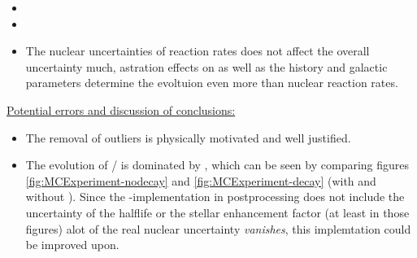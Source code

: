 \begin{itemize}
\item {}
  \item {}
  \item The nuclear uncertainties of reaction rates does not affect the overall uncertainty much, astration effects on  as well as the history and galactic parameters determine the evoltuion even more than nuclear reaction rates.
\end{itemize}

\underline{Potential errors and discussion of conclusions:}
\begin{itemize}
\item The removal of outliers is physically motivated and well justified.
\item The evolution of / is dominated by \betadecay, which can be seen by comparing figures \ref{fig:MCExperiment-nodecay} and \ref{fig:MCExperiment-decay} (with and without \betadecay). Since the \betadecay-implementation in postprocessing does not include the uncertainty of the  halflife or the stellar enhancement factor (at least in those figures) alot of the real nuclear uncertainty \textit{vanishes}, this implemtation could be improved upon.
\end{itemize}

